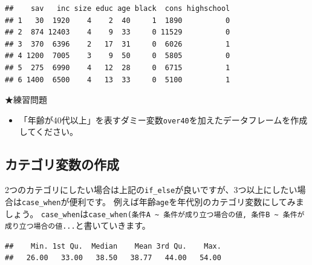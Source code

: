 \documentclass[
]{book}
\newenvironment{Shaded}{\begin{snugshade}}{\end{snugshade}}
\newcommand{\CommentTok}[1]{\textcolor[rgb]{0.56,0.35,0.01}{\textit{#1}}}
\newcommand{\FunctionTok}[1]{\textcolor[rgb]{0.00,0.00,0.00}{#1}}
\newcommand{\NormalTok}[1]{#1}
\newcommand{\SpecialCharTok}[1]{\textcolor[rgb]{0.00,0.00,0.00}{#1}}
\providecommand{\tightlist}{%
  \setlength{\itemsep}{0pt}\setlength{\parskip}{0pt}}
\begin{document}
\begin{verbatim}
##    sav   inc size educ age black  cons highschool
## 1   30  1920    4    2  40     1  1890          0
## 2  874 12403    4    9  33     0 11529          0
## 3  370  6396    2   17  31     0  6026          1
## 4 1200  7005    3    9  50     0  5805          0
## 5  275  6990    4   12  28     0  6715          1
## 6 1400  6500    4   13  33     0  5100          1
\end{verbatim}

★練習問題

\begin{itemize}
\tightlist
\item
  「年齢が40代以上」を表すダミー変数\texttt{over40}を加えたデータフレームを作成してください。
\end{itemize}

\hypertarget{ux30abux30c6ux30b4ux30eaux5909ux6570ux306eux4f5cux6210}{%
\subsection{カテゴリ変数の作成}\label{ux30abux30c6ux30b4ux30eaux5909ux6570ux306eux4f5cux6210}}

2つのカテゴリにしたい場合は上記の\texttt{if\_else}が良いですが、3つ以上にしたい場合は\texttt{case\_when}が便利です。
例えば年齢\texttt{age}を年代別のカテゴリ変数にしてみましょう。
\texttt{case\_when}は\texttt{case\_when(条件A\ \textasciitilde{}\ 条件が成り立つ場合の値,\ 条件B\ \textasciitilde{}\ 条件が成り立つ場合の値...}と書いていきます。

\begin{Shaded}
\end{Shaded}

\begin{verbatim}
##    Min. 1st Qu.  Median    Mean 3rd Qu.    Max. 
##   26.00   33.00   38.50   38.77   44.00   54.00
\end{verbatim}
\end{document}
